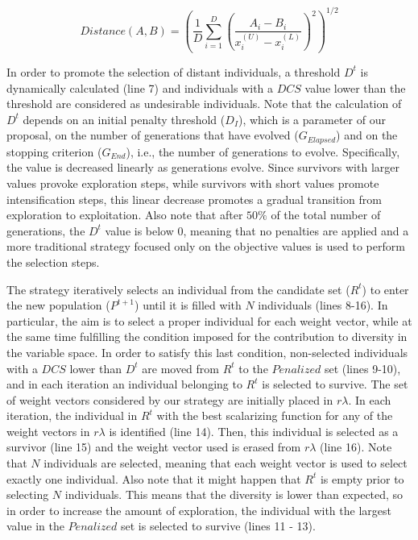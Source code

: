 \begin{equation}\label{eqn:distance}
Distance(A, B) =   \left ( \frac{1}{D}  \sum_{i=1}^D \left ( \frac{A_i - B_i}{x_i^{(U)} - x_i^{(L)}} \right )^2  \right)^{1/2}
\end{equation}

In order to promote the selection of distant individuals, a threshold $D^t$ is dynamically calculated (line 7) and 
individuals with a $DCS$ value lower than the threshold are considered as undesirable individuals.
%
Note that the calculation of $D^t$ depends on an initial penalty threshold ($D_I$), which is a parameter of our proposal,
on the number of generations that have evolved ($G_{Elapsed}$) and on the stopping criterion ($G_{End}$), i.e., the number of
generations to evolve.
%
Specifically, the value is decreased linearly as generations evolve.
%
Since survivors with larger \DCS{} values provoke exploration steps, while survivors with short \DCS{} values promote
intensification steps, this linear decrease promotes
a gradual transition from exploration to exploitation.
%
Also note that after $50\%$ of the total number of generations, the $D^t$ value is below 0, 
meaning that no penalties are applied and a more traditional strategy focused only on the objective values
is used to perform the selection steps.

The strategy iteratively selects an individual from the candidate set ($R^t$) to enter the new population ($P^{t+1}$) until
it is filled with $N$ individuals (lines 8-16).
%
In particular, the aim is to select a proper individual for each weight vector, while at the same time fulfilling
the condition imposed for the contribution to diversity in the variable space.
%
In order to satisfy this last condition, non-selected individuals with a $DCS$
lower than $D^t$ are moved from $R^t$ to the $Penalized$ set (lines 9-10), and in each iteration
an individual belonging to $R^t$ is selected to survive.
%
The set of weight vectors considered by our strategy are initially placed in $r\lambda$.
%
In each iteration, the individual in $R^t$ with the best scalarizing function for any of the weight vectors in
$r\lambda$ is identified (line 14).
%
Then, this individual is selected as a survivor (line 15) and the weight vector used is erased
from $r\lambda$ (line 16).
%
Note that $N$ individuals are selected, meaning that each weight vector is used to select exactly one individual.
%
Also note that it might happen that $R^t$ is empty prior to selecting $N$ individuals.
%
This means that the diversity is lower than expected, so
in order to increase the amount of exploration, the individual with the largest \DCS{} value in
the $Penalized$ set is selected to survive (lines 11 - 13).
